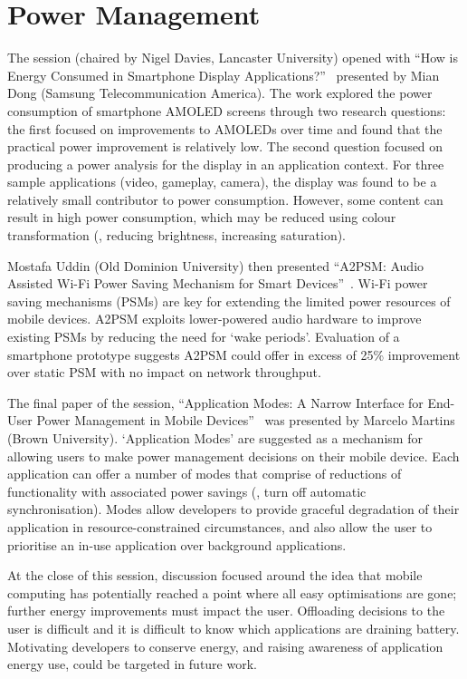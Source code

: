 \section{Power Management}
\label{sec:power}
The session (chaired by Nigel Davies, Lancaster University)
opened with
``How is Energy Consumed in Smartphone Display
Applications?''~\cite{chen13} presented by Mian Dong (Samsung
Telecommunication America). The work explored
the power consumption of smartphone AMOLED screens through two research questions: the first focused on improvements to AMOLEDs over time
and found that the practical power improvement is relatively low.
The second question focused on 
producing a power analysis for the display in an application context. For three 
sample applications (video, gameplay, camera), the display was found to be a 
relatively small contributor to power consumption. However, some content can result in high power consumption, which may be reduced using colour 
transformation (\eg{}, reducing brightness, increasing saturation).

Mostafa Uddin (Old Dominion University) then presented ``A2PSM: Audio Assisted 
Wi-Fi Power Saving Mechanism for Smart Devices''~\cite{uddin13}. Wi-Fi
power saving mechanisms 
(PSMs) are key for extending the limited power resources of mobile devices. 
A2PSM exploits lower-powered audio hardware to 
improve existing PSMs by reducing the need for `wake periods'. 
Evaluation of a smartphone prototype suggests A2PSM could offer in excess of 25\%
improvement over static PSM with no impact on network throughput.

The final paper of the session, ``Application Modes: A Narrow Interface for End-
User Power Management in Mobile Devices''~\cite{martins13} was presented
by Marcelo Martins (Brown 
University). `Application Modes' are suggested as a mechanism for allowing 
users to make power management decisions on their mobile device. Each 
application can offer a number of modes that comprise of reductions of 
functionality with associated power savings (\eg{}, turn off automatic 
synchronisation). Modes allow developers to provide graceful degradation of their 
application in resource-constrained circumstances, and also allow the user to 
prioritise an in-use application over background applications.

At the close of this session, discussion focused around the idea
that mobile computing has potentially reached a point where all easy 
optimisations are gone; further energy improvements must impact the 
user. Offloading decisions to the user is difficult and it is difficult to 
know which applications are draining battery. Motivating 
developers to conserve energy, and raising awareness of application energy use, 
could be targeted in future work. %
